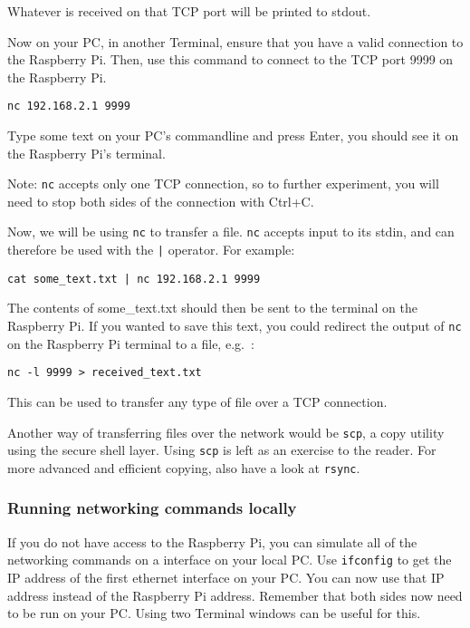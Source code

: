 \documentclass[a4paper]{article}
\begin{document}
Whatever is received on that TCP port will be printed to stdout. 


Now on your PC, in another Terminal, ensure that you have a valid connection to the Raspberry Pi. Then, use this command to connect to the TCP port 9999 on the Raspberry Pi. 
\begin{lstlisting}
nc 192.168.2.1 9999
\end{lstlisting}
Type some text on your PC's commandline and press Enter, you should see it on the Raspberry Pi's terminal. 

Note: \texttt{nc} accepts only one TCP connection, so to further experiment, you will need to stop both sides of the connection with Ctrl+C. 

Now, we will be using \texttt{nc} to transfer a file. \texttt{nc} accepts input to its stdin, and can therefore be used with the \texttt{|} operator. For example: 
\begin{lstlisting}
cat some_text.txt | nc 192.168.2.1 9999
\end{lstlisting}
The contents of some\_text.txt should then be sent to the terminal on the Raspberry Pi. If you wanted to save this text, you could redirect the output of \texttt{nc} on the Raspberry Pi terminal to a file, e.g.\ :
\begin{lstlisting}
nc -l 9999 > received_text.txt
\end{lstlisting}
This can be used to transfer any type of file over a TCP connection. 

Another way of transferring files over the network would be \texttt{scp}, a copy utility using the secure shell layer. Using \texttt{scp} is left as an exercise to the reader. For more advanced and efficient copying, also have a look at \texttt{rsync}.

\subsubsection{Running networking commands locally}
If you do not have access to the Raspberry Pi, you can simulate all of the networking commands on a interface on your local PC. Use \texttt{ifconfig} to get the IP address of the first ethernet interface on your PC. You can now use that IP address instead of the Raspberry Pi address. Remember that both sides now need to be run on your PC. Using two Terminal windows can be useful for this. 
\end{document}
